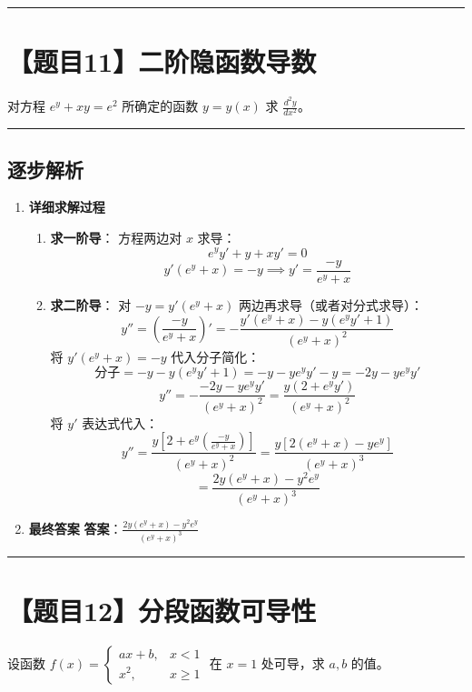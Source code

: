 \documentclass[UTF8]{ctexart}
\newenvironment{redenv}{\color{red}}{}
\newenvironment{detailedanalysis}{%
    \color{red}
    \begin{enumerate}[label=\textbf{第\arabic*步：}, leftmargin=*, align=left, itemsep=1.5ex]
}{%
    \end{enumerate}
}
\newcommand{\problemrule}{\noindent\rule{\textwidth}{1.5pt}\vspace{-0.8em}}
\newcommand{\analysisrule}{\noindent\rule{\textwidth}{0.8pt}\vspace{-0.8em}}
\begin{document}
\problemrule
\section*{【题目11】二阶隐函数导数}
对方程 $ e^{y} + xy = e^{2} $ 所确定的函数 $ y = y(x) $ 求 $ \frac{d^{2}y}{dx^{2}} $。

\begin{redenv}
\analysisrule
\subsection*{逐步解析}

\begin{detailedanalysis}
\item \textbf{详细求解过程}
\begin{enumerate}[label=(\arabic*)]
\item \textbf{求一阶导}：
方程两边对 $x$ 求导：
$$ e^y y' + y + xy' = 0 $$
$$ y'(e^y + x) = -y \implies y' = \frac{-y}{e^y + x} $$
\item \textbf{求二阶导}：
对 $-y = y'(e^y + x)$ 两边再求导（或者对分式求导）：
$$ y'' = \left( \frac{-y}{e^y + x} \right)' = - \frac{y'(e^y + x) - y(e^y y' + 1)}{(e^y + x)^2} $$
将 $y'(e^y+x) = -y$ 代入分子简化：
$$ \text{分子} = -y - y(e^y y' + 1) = -y - ye^y y' - y = -2y - y e^y y' $$
$$ y'' = - \frac{-2y - y e^y y'}{(e^y + x)^2} = \frac{y(2 + e^y y')}{(e^y + x)^2} $$
将 $y'$ 表达式代入：
$$ y'' = \frac{y [2 + e^y (\frac{-y}{e^y + x})]}{(e^y + x)^2} = \frac{y [2(e^y+x) - y e^y]}{(e^y+x)^3} $$
$$ = \frac{2y(e^y+x) - y^2 e^y}{(e^y+x)^3} $$
\end{enumerate}

\item \textbf{最终答案}
\textbf{答案}：$ \frac{2y(e^y+x) - y^2 e^y}{(e^y+x)^3} $
\end{detailedanalysis}
\end{redenv}

\problemrule
\section*{【题目12】分段函数可导性}
设函数 $ f(x)=\begin{cases}ax+b, & x<1\\ x^{2}, & x\geq1\end{cases} $ 在 $x=1$ 处可导，求 $a,b$ 的值。
\end{document}

